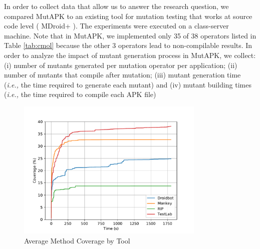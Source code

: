In order to collect data that allow us to answer the research question, we compared MutAPK to an existing tool for mutation testing that works at source code level ( MDroid+ \cite{linares2017enabling} ). 
The experiments were executed on a class-server machine. 
Note that in MutAPK, we implemented only 35 of 38 operators listed in Table \ref{tab:cmol} because the other 3 operators lead to non-compilable results. In order to analyze the impact of mutant generation process in MutAPK, we collect: (i) number of mutants generated per mutation operator per application; (ii) number of mutants that compile after mutation; (iii) mutant generation time (\textit{i.e.,} the time required to generate each mutant) and (iv) mutant building times (\textit{i.e.,} the time required to compile each APK file)
\begin{table}[t]
	\centering
	\caption{Applications used for the study}
	\label{tab:alufs}
\end{table}

\begin{figure}[h]
\centering
\includegraphics[width=0.8\textwidth]{../Figures/averageCoverageInstruAPK.pdf}
\caption{Average Method Coverage by Tool}\label{fig:averageCoverage}
\end{figure}

